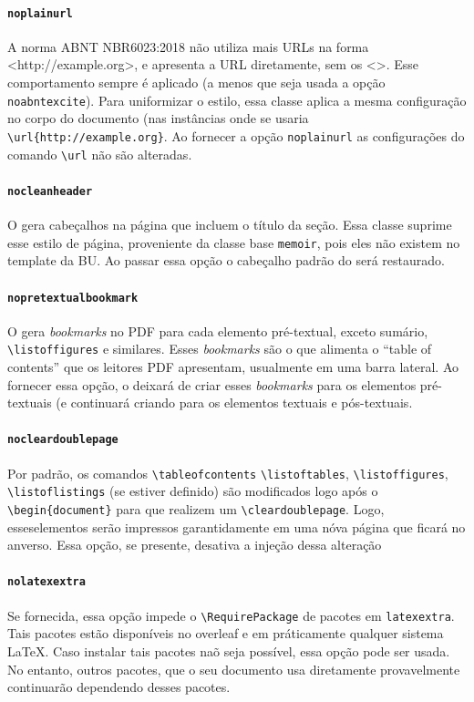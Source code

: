 \documentclass[embeddedlogo]{ufsc-thesis-rn46-2019}
\newcommand{\lacmd}[1]{\texttt{\textbackslash{}#1}}
\begin{document}
\paragraph*{\texttt{noplainurl}} A norma ABNT NBR6023:2018 não utiliza mais URLs
na forma <http://example.org>, e apresenta a URL diretamente, sem os <>.  Esse
comportamento sempre é aplicado (a menos que seja usada a opção
\texttt{noabntexcite}). Para uniformizar o estilo, essa classe aplica a mesma
configuração no corpo do documento (nas instâncias onde se usaria
\lacmd{url\{http://example.org\}}. Ao fornecer a opção \texttt{noplainurl} as
configurações do comando \lacmd{url} não são alteradas.


\paragraph*{\texttt{nocleanheader}} O \abnTeX{} gera cabeçalhos na página que
incluem o título da seção. Essa classe suprime esse estilo de página,
proveniente da classe base \texttt{memoir}, pois eles não existem no template
da BU. Ao passar essa opção o cabeçalho padrão do \abnTeX{} será restaurado.

\paragraph*{\texttt{nopretextualbookmark}} O \abnTeX{} gera \emph{bookmarks} no
PDF para cada elemento pré-textual, exceto sumário, \lacmd{listoffigures} e
similares. Esses \emph{bookmarks} são o que alimenta o ``table of contents'' que
os leitores PDF apresentam, usualmente em uma barra lateral.  Ao fornecer essa
opção, o \abnTeX{} deixará de criar esses \emph{bookmarks} para os elementos
pré-textuais (e continuará criando para os elementos textuais e pós-textuais.

\paragraph*{\texttt{nocleardoublepage}} Por padrão, os comandos
\lacmd{tableofcontents} \lacmd{listoftables}, \lacmd{listoffigures},
\lacmd{listoflistings} (se estiver definido) são modificados logo após o
\lacmd{begin\{document\}} para que realizem um \lacmd{cleardoublepage}. Logo,
esseselementos serão impressos garantidamente em uma nóva página que ficará no
anverso. Essa opção, se presente, desativa a injeção dessa alteração

\paragraph*{\texttt{nolatexextra}}
Se fornecida, essa opção impede o \lacmd{RequirePackage} de pacotes em \texttt{latexextra}.
Tais pacotes estão disponíveis no overleaf e em práticamente qualquer sistema
\LaTeX. Caso instalar tais pacotes naõ seja possível, essa opção pode ser usada.
No entanto, outros pacotes, que o seu documento usa diretamente provavelmente
continuarão dependendo desses pacotes.
\end{document}
